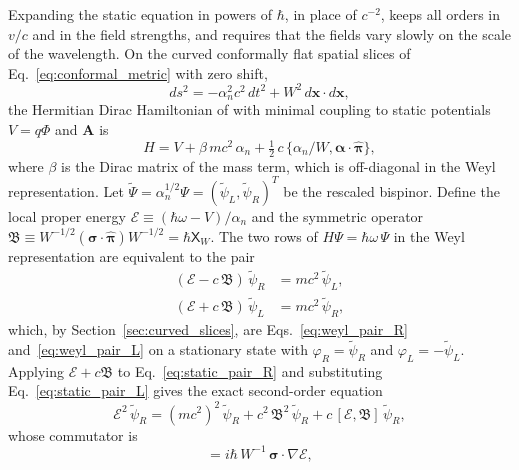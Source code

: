 \documentclass[aps,prd,onecolumn,tightenlines,nofootinbib,notitlepage,11pt,floatfix]{revtex4-2}
\theoremstyle{indentedtheorem}
\begin{document}
Expanding the static equation in powers of $\hbar$, in place of $c^{-2}$, keeps all orders in $v/c$ and in the field strengths, and requires that the fields vary slowly on the scale of the wavelength. On the curved conformally flat spatial slices of Eq.~\eqref{eq:conformal_metric} with zero shift,
\begin{equation}
    ds^2 = -\alpha_n^2c^2\,dt^2 + W^2\,d\mathbf{x}\cdot d\mathbf{x} ,
    \label{eq:W_metric}
\end{equation}
the Hermitian Dirac Hamiltonian of \citet{ObukhovSilenkoTeryaev2011Dirac} with minimal coupling to static potentials $V=q\Phi$ and $\mathbf{A}$ is
\begin{equation}
    H = V + \beta\,mc^2\,\alpha_n + \tfrac{1}{2}\,c\,\{\alpha_n/W,\boldsymbol{\alpha}\cdot\hat{\boldsymbol{\pi}}\} ,
    \label{eq:W_dirac}
\end{equation}
where $\beta$ is the Dirac matrix of the mass term, which is off-diagonal in the Weyl representation. Let $\tilde{\Psi} = \alpha_n^{1/2}\Psi = (\tilde{\psi}_L,\tilde{\psi}_R)^T$ be the rescaled bispinor. Define the local proper energy $\mathcal{E} \equiv (\hbar\omega - V)/\alpha_n$ and the symmetric operator $\mathfrak{B} \equiv W^{-1/2}(\boldsymbol{\sigma}\cdot\hat{\boldsymbol{\pi}})W^{-1/2} = \hbar\mathsf{X}_W$. The two rows of $H\Psi = \hbar\omega\,\Psi$ in the Weyl representation are equivalent to the pair
\begin{align}
    (\mathcal{E}-c\,\mathfrak{B})\,\tilde{\psi}_R &= mc^2\,\tilde{\psi}_L , \label{eq:static_pair_R} \\
    (\mathcal{E}+c\,\mathfrak{B})\,\tilde{\psi}_L &= mc^2\,\tilde{\psi}_R , \label{eq:static_pair_L}
\end{align}
which, by Section~\ref{sec:curved_slices}, are Eqs.~\eqref{eq:weyl_pair_R} and~\eqref{eq:weyl_pair_L} on a stationary state with $\varphi_R=\tilde{\psi}_R$ and $\varphi_L=-\tilde{\psi}_L$. Applying $\mathcal{E}+c\mathfrak{B}$ to Eq.~\eqref{eq:static_pair_R} and substituting Eq.~\eqref{eq:static_pair_L} gives the exact second-order equation
\begin{equation}
    \mathcal{E}^2\,\tilde{\psi}_R = (mc^2)^2\,\tilde{\psi}_R + c^2\,\mathfrak{B}^2\,\tilde{\psi}_R + c\,[\mathcal{E},\mathfrak{B}]\,\tilde{\psi}_R ,
    \label{eq:static_product}
\end{equation}
whose commutator is
\begin{equation}
    [\mathcal{E},\mathfrak{B}] = i\hbar\,W^{-1}\,\boldsymbol{\sigma}\cdot\nabla\mathcal{E} ,
    \label{eq:static_commutator_EB}
\end{equation}
\end{document}
